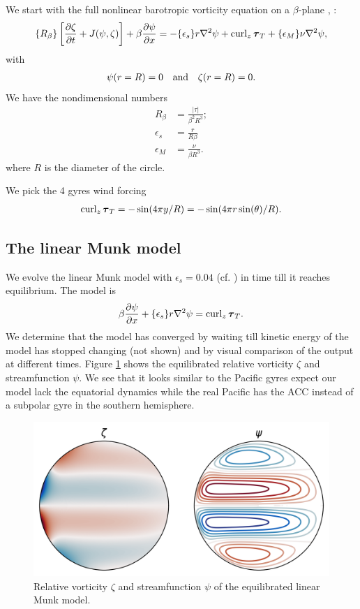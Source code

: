 We start with the full nonlinear barotropic vorticity equation on a $\beta$-plane \cite[(19.57)(19.59)]{Vallis_17}, \cite[\S 2]{IerleySheremet_95}:
\begin{align}
    \{R_\beta\}\left[\frac{\partial\zeta}{\partial t}+J(\psi,\zeta)\right]+\beta\frac{\partial\psi}{\partial x} = -\{\epsilon_s\}r\nabla^2\psi+\operatorname{curl}_z\boldsymbol{\tau}_T+\{\epsilon_M\}\nu\nabla^2\psi,
\end{align}
with
\begin{align}
    \psi(r=R) = 0 \quad \mbox{and} \quad \zeta(r=R) = 0.
\end{align}
We have the nondimensional numbers
\begin{align}
    R_\beta &= \frac{|\tau|}{\beta^2R^3};\\
    \epsilon_s &= \frac{r}{R\beta}\\
    \epsilon_M &= \frac{\nu}{\beta R^3}.
\end{align}
where $R$ is the diameter of the circle. 

We pick the 4 gyres wind forcing
\begin{align}
    \operatorname{curl}_z\boldsymbol{\tau}_T = -\sin(4\pi y/R) = -\sin(4\pi r\sin(\theta)/R).
\end{align}


\subsection{The linear Munk model}
We evolve the linear Munk model with $\epsilon_s=0.04$ (cf. \cite[Fig. 19.6]{Vallis_17}) in time till it reaches equilibrium. The model is
\begin{align}
    \beta\frac{\partial\psi}{\partial x}+\{\epsilon_s\}r\nabla^2\psi = \operatorname{curl}_z\boldsymbol{\tau}_T.
\end{align}
We determine that the model has converged by waiting till kinetic energy of the model has stopped changing (not shown) and by visual comparison of the output at different times. Figure \ref{fig:Gyre_stomlin_zetapsi} shows the equilibrated relative vorticity $\zeta$ and streamfunction $\psi$. We see that it looks similar to the Pacific gyres expect our model lack the equatorial dynamics while the real Pacific has the ACC instead of a subpolar gyre in the southern hemisphere.

\begin{figure}
    \centering
    \includegraphics{Gyre_stomlin_zetapsi}
    \caption{Relative vorticity $\zeta$ and streamfunction $\psi$ of the equilibrated linear Munk model.}
    \label{fig:Gyre_stomlin_zetapsi}
\end{figure}

